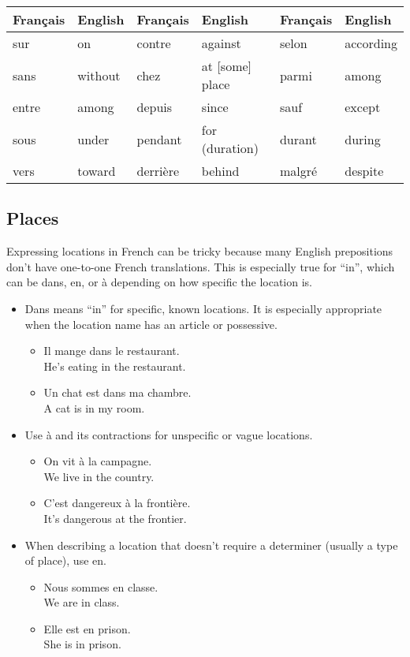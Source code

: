 \begin{center}\begin{tabular}{l|l||l|l||l|l}
\textbf{Fran{\c c}ais} & \textbf{English} & \textbf{Fran{\c c}ais} & \textbf{English}  & \textbf{Fran{\c c}ais} & \textbf{English} \\ \hline
sur & on & contre & against & selon & according \\
sans & without & chez & at [some] place & parmi & among \\ 
entre & among & depuis & since & sauf & except \\
sous & under & pendant & for (duration) & durant & during \\ 
vers & toward & derri{\`e}re & behind & malgr{\'e} & despite \\ 
\end{tabular}\end{center}


\pagebreak
\subsection{Places}

Expressing locations in French can be tricky because many English prepositions don't have one-to-one French translations. This is especially true for ``in'', which can be dans, en, or {\`a} depending on how specific the location is.

\begin{itemize}
  \item  Dans means ``in'' for specific, known locations. It is especially appropriate when the location name has an article or possessive.
	  \begin{itemize}
		  \item  Il mange dans le restaurant. \\ He's eating in the restaurant.
			\item  Un chat est dans ma chambre. \\ A cat is in my room.
		\end{itemize}
	\item  Use {\`a} and its contractions for unspecific or vague locations.
	  \begin{itemize}
		  \item  On vit {\`a} la campagne. \\ We live in the country.
			\item  C'est dangereux {\`a} la fronti{\`e}re. \\ It's dangerous at the frontier.
		\end{itemize}
	\item  When describing a location that doesn't require a determiner (usually a type of place), use en.
	  \begin{itemize}
		  \item  Nous sommes en classe. \\ We are in class.
			\item  Elle est en prison. \\ She is in prison.
		\end{itemize}
\end{itemize}


